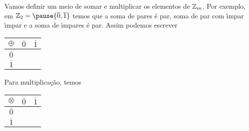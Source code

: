 \documentclass{beamer}
\begin{document}
    \begin{frame}
        Vamos definir um meio de somar \pause e multiplicar os elementos de $\mathbb{Z}_m$. \pause Por exemplo, em $\z_2 = \pause \{\overline{0},\overline{1}\}$ \pause temos que a soma de pares {\'e} par, \pause soma de par com {\'\i}mpar  {\'\i}mpar \pause e a soma de {\'\i}mpares {\'e} par. \pause Assim podemos escrever\pause

        \begin{table}[h]
           \centering 
           \setlength{\arrayrulewidth}{0,5\arrayrulewidth}
           \begin{tabular}{|c|c|c|} 
              \hline
              $\oplus$ & $\overline{0}$ & $\overline{1}$ \T\\
              \hline
              $\overline{0}$ & \phantom{abc} & \phantom{abc}\T\\
              \hline
              $\overline{1}$ & \phantom{abc} & \phantom{abc}\T\\
              \hline
           \end{tabular}
        \end{table}

        Para multiplica{\c c}{\~a}o, temos\pause

        \begin{table}[h]
           \centering 
           \setlength{\arrayrulewidth}{0,5\arrayrulewidth}
           \begin{tabular}{|c|c|c|} 
              \hline
              $\otimes$ & $\overline{0}$ & $\overline{1}$\T\\
              \hline
              $\overline{0}$ & \phantom{abc} & \phantom{abc}\T\\
              \hline
              $\overline{1}$ & \phantom{abc} & \phantom{abc}\T\\
              \hline
           \end{tabular}
        \end{table}
    \end{frame}
\end{document}
